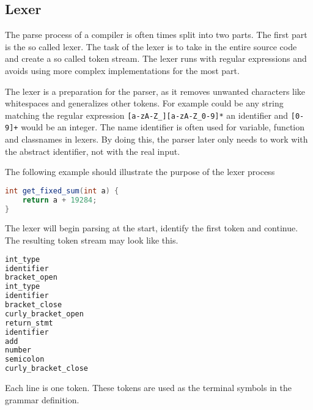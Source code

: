 
\subsection{Lexer}

The parse process of a compiler is often times split into two parts. The first part is the so called lexer. 
The task of the lexer is to take in the entire source code and create a so called token stream. 
The lexer runs with regular expressions and avoids using more complex implementations for the most part.

The lexer is a preparation for the parser, as it removes unwanted characters like whitespaces and generalizes 
other tokens.
For example could be any string matching the regular expression \verb|[a-zA-Z_][a-zA-Z_0-9]*| an identifier and \verb|[0-9]+| would be an integer. 
The name identifier is often used for variable, function and classnames in lexers. 
By doing this, the parser later only needs to work with the abstract identifier, not with the real input.

The following example should illustrate the purpose of the lexer process
\begin{lstlisting}[language=Java, caption="Example input for the lexer"]
int get_fixed_sum(int a) {
    return a + 19284;
}
\end{lstlisting}

The lexer will begin parsing at the start, identify the first token and continue. The resulting token stream may look like this.

\begin{lstlisting}[language=Java, caption="Example output of the lexer"]
int_type 
identifier
bracket_open
int_type
identifier
bracket_close
curly_bracket_open
return_stmt
identifier
add
number
semicolon
curly_bracket_close
\end{lstlisting}

Each line is one token. These tokens are used as the terminal symbols in the grammar definition.